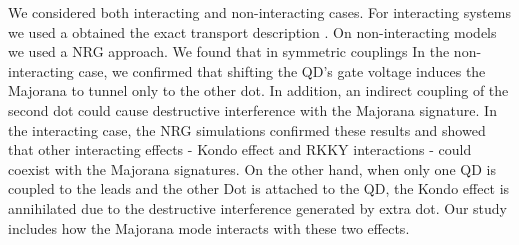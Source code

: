 \documentclass[showpacs,aps,prb,reprint,superscriptaddress]{revtex4-1}
\begin{document}
 
  We  considered both interacting and non-interacting cases. For interacting systems we used a obtained the exact transport description . On non-interacting models we used a NRG approach.   We found that in symmetric couplings  In the non-interacting case, we confirmed that shifting the QD’s gate voltage induces the Majorana to tunnel only to the other dot. In addition, an indirect coupling of the second dot could cause destructive interference with the Majorana signature. In the interacting case,  the NRG simulations confirmed these results and showed that other interacting effects -  Kondo effect and RKKY interactions \cite{ruderman_indirect_1954,kasuya_theory_1956,yosida_magnetic_1957} - could coexist with the Majorana signatures. On the other hand, when only one QD is coupled to the leads and the other Dot is attached to the QD,  the Kondo effect is annihilated due to the destructive interference  generated by extra dot. \cite{dias_da_silva_transmission_2008} Our study includes how the Majorana mode interacts with these two effects.  
 
 





\end{document}
